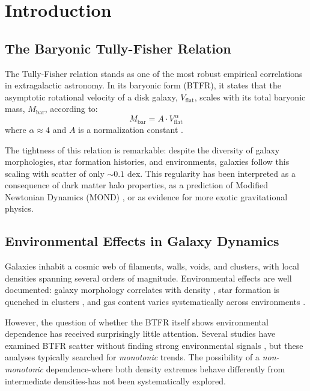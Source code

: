 \documentclass[12pt,a4paper]{article}
\newcommand{\Mbar}{M_{\text{bar}}}
\newcommand{\Vflat}{V_{\text{flat}}}
\begin{document}
\section{Introduction}
\label{sec:introduction}

\subsection{The Baryonic Tully-Fisher Relation}

The Tully-Fisher relation \citep{Tully1977} stands as one of the most robust empirical correlations in extragalactic astronomy. In its baryonic form (BTFR), it states that the asymptotic rotational velocity of a disk galaxy, $\Vflat$, scales with its total baryonic mass, $\Mbar$, according to:
\begin{equation}
\Mbar = A \cdot \Vflat^{\,\alpha}
\label{eq:btfr}
\end{equation}
where $\alpha \approx 4$ and $A$ is a normalization constant \citep{McGaugh2000, McGaugh2012, Lelli2016}.

The tightness of this relation is remarkable: despite the diversity of galaxy morphologies, star formation histories, and environments, galaxies follow this scaling with scatter of only $\sim 0.1$ dex. This regularity has been interpreted as a consequence of dark matter halo properties, as a prediction of Modified Newtonian Dynamics (MOND) \citep{Milgrom1983}, or as evidence for more exotic gravitational physics.

\subsection{Environmental Effects in Galaxy Dynamics}

Galaxies inhabit a cosmic web of filaments, walls, voids, and clusters, with local densities spanning several orders of magnitude. Environmental effects are well documented: galaxy morphology correlates with density \citep{Dressler1980}, star formation is quenched in clusters \citep{Gunn1972}, and gas content varies systematically across environments \citep{Haynes1984}.

However, the question of whether the BTFR itself shows environmental dependence has received surprisingly little attention. Several studies have examined BTFR scatter without finding strong environmental signals \citep{Ponomareva2018, Lelli2019}, but these analyses typically searched for \textit{monotonic} trends. The possibility of a \textit{non-monotonic} dependence-where both density extremes behave differently from intermediate densities-has not been systematically explored.
\end{document}
